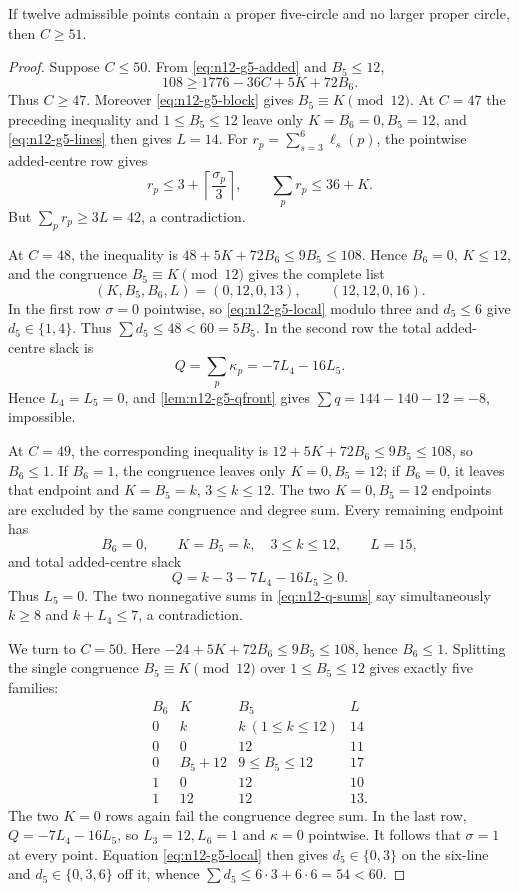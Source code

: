 \begin{lemma}\label{lem:n12-gamma5}
If twelve admissible points contain a proper five-circle and no larger
proper circle, then $C\ge51$.
\end{lemma}

\begin{proof}
Suppose $C\le50$.  From \eqref{eq:n12-g5-added} and $B_5\le12$,
\[
108\ge1776-36C+5K+72B_6.
\]
Thus $C\ge47$.  Moreover \eqref{eq:n12-g5-block} gives
$B_5\equiv K\pmod {12}$.  At $C=47$ the preceding inequality and
$1\le B_5\le12$ leave only
$K=B_6=0,B_5=12$, and \eqref{eq:n12-g5-lines} then gives $L=14$.  For
$r_p=\sum_{s=3}^6\ell_s(p)$, the pointwise added-centre row gives
\[
 r_p\le3+\left\lceil\frac{\sigma_p}{3}\right\rceil,\qquad
 \sum_pr_p\le36+K.
\]
But $\sum_pr_p\ge3L=42$, a contradiction.

At $C=48$, the inequality is
$48+5K+72B_6\le9B_5\le108$.  Hence $B_6=0$, $K\le12$, and the congruence
$B_5\equiv K\pmod {12}$ gives the complete list
\[
 (K,B_5,B_6,L)=(0,12,0,13),\qquad(12,12,0,16).
\]
In the first row $\sigma=0$ pointwise, so
\eqref{eq:n12-g5-local} modulo three and $d_5\le6$ give
$d_5\in\{1,4\}$.  Thus $\sum d_5\le48<60=5B_5$.  In the second row the
total added-centre slack is
\[
 Q=\sum_p\kappa_p=-7L_4-16L_5.
\]
Hence $L_4=L_5=0$, and \cref{lem:n12-g5-qfront} gives
$\sum q=144-140-12=-8$, impossible.

At $C=49$, the corresponding inequality is
$12+5K+72B_6\le9B_5\le108$, so $B_6\le1$.  If $B_6=1$, the congruence
leaves only $K=0,B_5=12$; if $B_6=0$, it leaves that endpoint and
$K=B_5=k$, $3\le k\le12$.  The two $K=0,B_5=12$ endpoints are
excluded by the same congruence and degree sum.  Every remaining endpoint
has
\[
 B_6=0,\qquad K=B_5=k,\quad3\le k\le12,\qquad L=15,
\]
and total added-centre slack
\[
 Q=k-3-7L_4-16L_5\ge0.
\]
Thus $L_5=0$.  The two nonnegative sums in
\eqref{eq:n12-q-sums} say simultaneously $k\ge8$ and $k+L_4\le7$, a
contradiction.

We turn to $C=50$.  Here
$-24+5K+72B_6\le9B_5\le108$, hence $B_6\le1$.  Splitting the single
congruence $B_5\equiv K\pmod {12}$ over $1\le B_5\le12$ gives exactly five
families:
\begin{equation}\label{eq:n12-C50-five-fronts}
\begin{array}{c|c|c|c}
B_6&K&B_5&L\\ \hline
0&k&k\ (1\le k\le12)&14\\
0&0&12&11\\
0&B_5+12&9\le B_5\le12&17\\
1&0&12&10\\
1&12&12&13.
\end{array}
\end{equation}
The two $K=0$ rows again fail the congruence degree sum.  In the last row,
$Q=-7L_4-16L_5$, so $L_3=12,L_6=1$ and $\kappa=0$ pointwise.  It follows
that $\sigma=1$ at every point.  Equation \eqref{eq:n12-g5-local} then
gives $d_5\in\{0,3\}$ on the six-line and
$d_5\in\{0,3,6\}$ off it, whence
$\sum d_5\le6\cdot3+6\cdot6=54<60$.


\end{proof}
